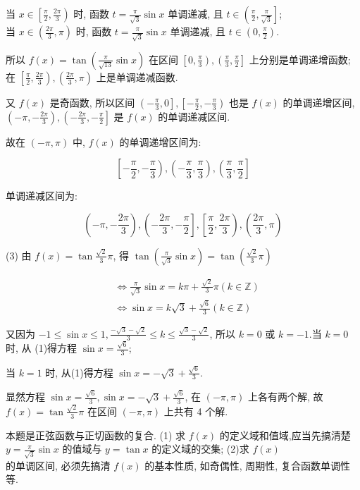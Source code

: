 \begin{solution}
			当 $x \in\left[\frac{\pi}{2}, \frac{2 \pi}{3}\right)$ 时, 函数 $t=\frac{\pi}{\sqrt{3}} \sin x$ 单调递减, 且 $t \in\left(\frac{\pi}{2}, \frac{\pi}{\sqrt{3}}\right]$;\\
	当 $x \in\left(\frac{2 \pi}{3}, \pi\right)$ 时, 函数 $t=\frac{\pi}{\sqrt{3}} \sin x$ 单调递减, 且 $t \in\left(0, \frac{\pi}{2}\right)$.

	所以 $f(x)=\tan \left(\frac{\pi}{\sqrt{13}} \sin x\right)$ 在区间 $\left[0, \frac{\pi}{3}\right),\left(\frac{\pi}{3}, \frac{\pi}{2}\right]$ 上分别是单调递增函数; 在 $\left[\frac{\pi}{2}, \frac{2 \pi}{3}\right),\left(\frac{2 \pi}{3}, \pi\right)$ 上是单调递减函数.

				又 $f(x)$ 是奇函数, 所以区间 $\left(-\frac{\pi}{3}, 0\right],\left[-\frac{\pi}{2},-\frac{\pi}{3}\right)$ 也是 $f(x)$ 的单调递增区间, $\left(-\pi,-\frac{2 \pi}{3}\right),\left(-\frac{2 \pi}{3},-\frac{\pi}{2}\right]$ 是 $f(x)$ 的单调递减区间.

	故在 $(-\pi, \pi)$ 中, $f(x)$ 的单调递增区间为:

	$$
		\left[-\frac{\pi}{2},-\frac{\pi}{3}\right),\left(-\frac{\pi}{3}, \frac{\pi}{3}\right),\left(\frac{\pi}{3}, \frac{\pi}{2}\right]
	$$

	单调递减区间为:

	$$
		\left(-\pi,-\frac{2 \pi}{3}\right),\left(-\frac{2 \pi}{3},-\frac{\pi}{2}\right],\left[\frac{\pi}{2}, \frac{2 \pi}{3}\right),\left(\frac{2 \pi}{3}, \pi\right)
	$$

	(3) 由 $f(x)=\tan \frac{\sqrt{2}}{3} \pi$, 得 $\tan \left(\frac{\pi}{\sqrt{3}} \sin x\right)=\tan \left(\frac{\sqrt{2}}{3} \pi\right)$


	\begin{align*}
		 & \Leftrightarrow \frac{\pi}{\sqrt{3}} \sin x=k \pi+\frac{\sqrt{2}}{3} \pi(k \in \mathbb{Z}) \\
		 & \Leftrightarrow \sin x=k \sqrt{3}+\frac{\sqrt{6}}{3}(k \in \mathbb{Z}) \tag{1}
	\end{align*}


	又因为 $-1 \leqslant \sin x \leqslant 1, \frac{-\sqrt{3}-\sqrt{2}}{3} \leqslant k \leqslant \frac{\sqrt{3}-\sqrt{2}}{3}$, 所以 $k=0$ 或 $k=-1$.当 $k=0$ 时, 从 (1)得方程 $\sin x=\frac{\sqrt{6}}{3}$;

	当 $k=1$ 时, 从(1)得方程 $\sin x=-\sqrt{3}+\frac{\sqrt{6}}{3}$.

	显然方程 $\sin x=\frac{\sqrt{6}}{3}, \sin x=-\sqrt{3}+\frac{\sqrt{6}}{3}$, 在 $(-\pi, \pi)$ 上各有两个解, 故 $f(x)=\tan \frac{\sqrt{2}}{3} \pi$ 在区间 $(-\pi, \pi)$ 上共有 4 个解.
\end{solution}
\begin{note}
	本题是正弦函数与正切函数的复合. (1) 求 $f(x)$ 的定义域和值域,应当先搞清楚 $y=\frac{\pi}{\sqrt{3}} \sin x$ 的值域与 $y=\tan x$ 的定义域的交集; (2)求 $f(x)$\\
	的单调区间, 必须先搞清 $f(x)$ 的基本性质, 如奇偶性, 周期性, 复合函数单调性等.
\end{note}


